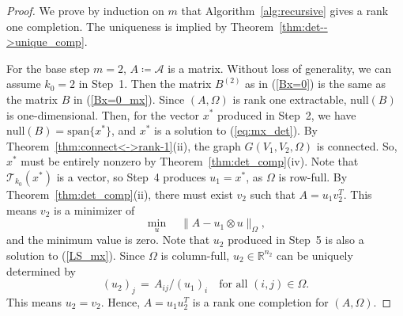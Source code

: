 \documentclass{amsart}
\newcommand{\re}{\mathbb{R}}
\newcommand{\reff}[1]{(\ref{#1})}
\newcommand{\mc}[1]{\mathcal{#1}}
\newcommand{\Span}{\mbox{span}}
\newcommand{\be}{\begin{equation}}
\newcommand{\ee}{\end{equation}}
\theoremstyle{definition}
\numberwithin{equation}{section}
\begin{document}
\begin{proof}
We prove by induction on $m$ that Algorithm~\ref{alg:recursive} gives a rank one completion.
The uniqueness is implied by Theorem~\ref{thm:det-->unique_comp}.

For the base step $m=2$, $A \coloneqq \mc{A}$ is a matrix.
Without loss of generality, we can assume $k_0=2$ in Step~1.
Then the matrix $B^{(2)}$ as in \reff{Bx=0} is the same as the matrix $B$ in \reff{Bx=0_mx}.
Since $(A, \Omega)$ is rank one extractable, $\text{null}(B)$ is one-dimensional.
Then, for the vector $x^*$ produced in Step~2, 
we have $\text{null}(B) = \Span\{x^*\}$,
and $x^*$ is a solution to \reff{eq:mx_det}.
By Theorem~\ref{thm:connect<->rank-1}(ii), 
the graph $G(V_1, V_2, \Omega)$ is connected.
So, $x^*$ must be entirely nonzero by Theorem~\ref{thm:det_comp}(iv).
Note that $\mc{T}_{k_0}(x^*)$ is a vector, so 
Step~4 produces $u_1 = x^*$, as $\Omega$ is row-full.
By Theorem~\ref{thm:det_comp}(ii), 
there must exist $v_2$ such that $A = u_1v_2^T$.
This means $v_2$ is a minimizer of 
\be\label{LS_mx}
\min_u \quad \| A - u_1 \otimes u \|_{\Omega},
\ee
and the minimum value is zero.
Note that $u_2$ produced in Step~5 is also a solution to \reff{LS_mx}.
Since $\Omega$ is column-full,
$u_2 \in \re^{n_2}$ can be uniquely determined by
\[
(u_2)_j \,=\, A_{ij} / (u_1)_i \quad \text{for all } (i,j) \in \Omega.
\]
This means $u_2 = v_2$.
Hence, $A = u_1u_2^T$ is a rank one completion for $(A, \Omega)$.



\end{proof}
\end{document}
